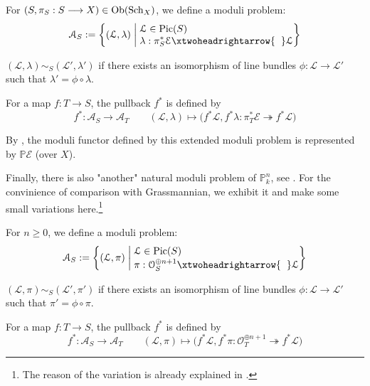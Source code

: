 \begin{eg}[{Projective bundle\footnote{There is an notational abuse in \cite{FOAG}. From my personal point of view, it's better to replace $\mathbb{P}\mathcal{E}$ with $\mathbb{P}\mathcal{E}^{\vee}$ or $\mathbb{P}V^{\vee}$ with $\mathbb{P}V$ to make symbols consistent. } $\mathbb{P}\mathcal{E}=\Proj(\Sym^{\bullet} \mathcal{E})$, see \cite[17.2.3]{FOAG}}]\hspace{1cm}

For $(S,\pi_S: S \longrightarrow X) \in \operatorname{Ob}(\operatorname{Sch}_{X})$, we define a moduli problem:
$$\mathcal{A}_S:=\left\{(\mathcal{L},\lambda)  \;\middle|\; \begin{aligned}
&\\[-5mm]
&\mathcal{L} \in \Pic(S)\\[-1mm]
& \lambda:\pi_S^* \mathcal{E} \xtwoheadrightarrow{\hspace{2mm}}  \mathcal{L}
\end{aligned}
 \right\}$$
 
   $(\mathcal{L},\lambda) \sim_S (\mathcal{L}',\lambda')$ if there exists an isomorphism of line bundles $\phi:\mathcal{L} \longrightarrow \mathcal{L}'$ such that $\lambda'=\phi \circ \lambda$.
   
   For a map $f:T \longrightarrow S$, the pullback $f^*$ is defined by
      $$f^*:\mathcal{A}_S \longrightarrow \mathcal{A}_T \qquad (\mathcal{L},\lambda) \longmapsto \big(f^*\mathcal{L},f^* \lambda:\pi_T^*\mathcal{E} \twoheadrightarrow f^*\mathcal{L}\big)$$
      
      By \cite[Proposition II.7.12]{hartshorne2013algebraic}, the moduli functor defined by this extended moduli problem is represented by $\mathbb{P}\mathcal{E}$ (over $X$).
\end{eg}

Finally, there is also "another" natural moduli problem of $\mathbb{P}_k^n$, see \cite[Example 2.4]{modulicurve}. For the convinience of comparison with Grassmannian, we exhibit it and make some small variations here.\footnote{The reason of the variation is already explained in \cite[16.7, page 442]{FOAG}.}

\begin{eg}
For $n \geqslant 0$, we define a moduli problem:
$$\mathcal{A}_S:=\left\{(\mathcal{L},\pi)  \;\middle|\; \begin{aligned}
&\\[-5mm]
&\mathcal{L} \in \Pic(S)\\[-1mm]
& \pi:\mathcal{O}_S^{\oplus n+1} \xtwoheadrightarrow{\hspace{2mm}}  \mathcal{L}
\end{aligned}
 \right\}$$
 
   $(\mathcal{L},\pi) \sim_S (\mathcal{L}',\pi')$ if there exists an isomorphism of line bundles $\phi:\mathcal{L} \longrightarrow \mathcal{L}'$ such that $\pi'=\phi \circ \pi$.
   
   For a map $f:T \longrightarrow S$, the pullback $f^*$ is defined by
      $$f^*:\mathcal{A}_S \longrightarrow \mathcal{A}_T \qquad (\mathcal{L},\pi) \longmapsto \big(f^*\mathcal{L},f^* \pi:\mathcal{O}_T^{\oplus n+1} \twoheadrightarrow f^*\mathcal{L}\big)$$
\end{eg}
